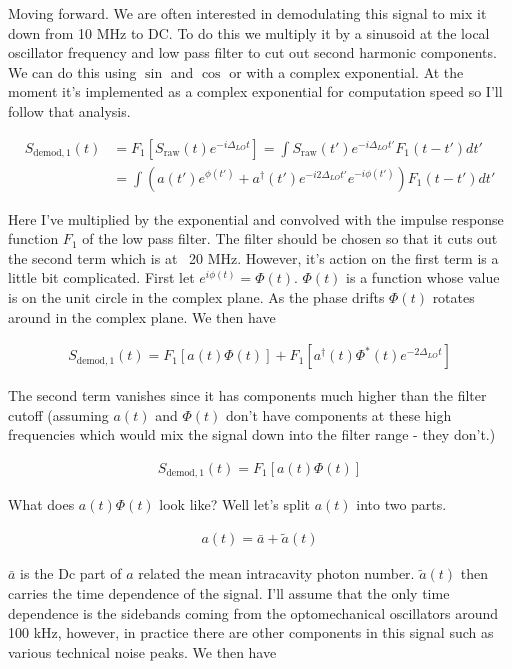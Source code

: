 \documentclass[12pt]{article}
\begin{document}
Moving forward. We are often interested in demodulating this signal to mix it down from 10 MHz to DC. To do this we multiply it by a sinusoid at the local oscillator frequency and low pass filter to cut out second harmonic components. We can do this using $\sin$ and $\cos$ or with a complex exponential. At the moment it's implemented as a complex exponential for computation speed so I'll follow that analysis.

\begin{align}
S_{\text{demod},1}(t) &= F_1\left[S_{\text{raw}}(t) e^{-i\Delta_{LO}t}\right]=\int S_{\text{raw}}(t') e^{-i\Delta_{LO}t'} F_1(t-t') dt'\\
&= \int \left(a(t')e^{\phi(t')} + a^{\dag}(t')e^{-i2\Delta_{LO}t'}e^{-i\phi(t')}\right) F_1(t-t')dt'
\end{align}

Here I've multiplied by the exponential and convolved with the impulse response function $F_1$ of the low pass filter. The filter should be chosen so that it cuts out the second term which is at ~20 MHz. However, it's action on the first term is a little bit complicated. First let $e^{i\phi(t)} = \Phi(t)$. $\Phi(t)$ is a function whose value is on the unit circle in the complex plane. As the phase drifts $\Phi(t)$ rotates around in the complex plane. We then have

\begin{align}
S_{\text{demod},1}(t) = F_1\left[a(t)\Phi(t)\right] + F_1\left[a^{\dag}(t)\Phi^*(t) e^{-2\Delta_{LO}t} \right]
\end{align}

The second term vanishes since it has components much higher than the filter cutoff (assuming $a(t)$ and $\Phi(t)$ don't have components at these high frequencies which would mix the signal down into the filter range - they don't.)

\begin{align}
S_{\text{demod},1}(t) = F_1\left[a(t)\Phi(t)\right]
\end{align}

What does $a(t)\Phi(t)$ look like? Well let's split $a(t)$ into two parts.

\begin{align}
a(t) = \bar{a} + \tilde{a}(t)
\end{align}

$\bar{a}$ is the Dc part of $a$ related the mean intracavity photon number. $\tilde{a}(t)$ then carries the time dependence of the signal. I'll assume that the only time dependence is the sidebands coming from the optomechanical oscillators around 100 kHz, however, in practice there are other components in this signal such as various technical noise peaks.
We then have
\end{document}
